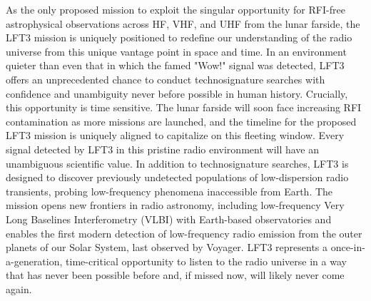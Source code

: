 \documentclass[preprint]{aastex631}
\begin{document}
As the only proposed mission to exploit the singular opportunity for RFI-free astrophysical observations across HF, VHF, and UHF from the lunar farside, the LFT3 mission is uniquely positioned to redefine our understanding of the radio universe from this unique vantage point in space and time. In an environment quieter than even that in which the famed "Wow!" signal was detected, LFT3 offers an unprecedented chance to conduct technosignature searches with confidence and unambiguity never before possible in human history. Crucially, this opportunity is time sensitive. The lunar farside will soon face increasing RFI contamination as more missions are launched, and the timeline for the proposed LFT3 mission is uniquely aligned to capitalize on this fleeting window. Every signal detected by LFT3 in this pristine radio environment will have an unambiguous scientific value. In addition to technosignature searches, LFT3 is designed to discover previously undetected populations of low-dispersion radio transients, probing low-frequency phenomena inaccessible from Earth. The mission opens new frontiers in radio astronomy, including low-frequency Very Long Baselines Interferometry (VLBI) with Earth-based observatories and enables the first modern detection of low-frequency radio emission from the outer planets of our Solar System, last observed by Voyager. LFT3 represents a once-in-a-generation, time-critical opportunity to listen to the radio universe in a way that has never been possible before and, if missed now, will likely never come again.

\end{document}

